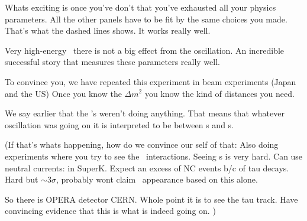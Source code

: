 {Whats exciting is once you've don't that you've exhausted all your physics parameters.  
All the other panels have to be fit by the same choices you made. 
That's what the dashed lines shows. 
It works really well.

Very high-energy \nus\ there is not a big effect from the oscillation.
An incredible successful story that measures these parameters really well. 

To convince you, we have repeated this experiment in beam experiments (Japan and the US) 
Once you know the $\Delta m^2$ you know the kind of distances you need.

We say earlier that the \nue's weren't doing anything. 
That means that whatever oscillation was going on it is interpreted to be between \numu s  and \nutau s.

(If that's whats happening, how do we convince our self of that:
Also doing experiments where you try to see the \nutau\ interactions. 
Seeing \nutau s is very hard. 
Can use neutral currents: in SuperK. 
Expect an excess of NC events b/c of tau decays. 
Hard but $\sim3\sigma$, probably wont claim \nutau\ appearance based on this alone. 

So there is OPERA detector CERN. 
Whole point it is to see the tau track.  
Have convincing evidence that this is what is indeed going on.
)

}



